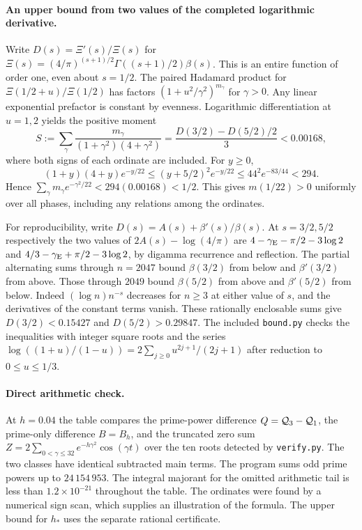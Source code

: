 \paragraph{An upper bound from two values of the completed logarithmic derivative.}
Write $D(s)=\Xi'(s)/\Xi(s)$ for
$\Xi(s)=(4/\pi)^{(s+1)/2}\Gamma((s+1)/2)\beta(s)$.
This is an entire function of order one, even about $s=1/2$.
The paired Hadamard product for
$\Xi(1/2+u)/\Xi(1/2)$ has factors
$(1+u^2/\gamma^2)^{m_\gamma}$ for $\gamma>0$.
Any linear exponential prefactor is constant by evenness.
Logarithmic differentiation at $u=1,2$ yields the positive moment
\[
 S:=\sum_{\gamma}\frac{m_\gamma}{(1+\gamma^2)(4+\gamma^2)}
       =\frac{D(3/2)-D(5/2)/2}{3}<0.00168 ,
\]
where both signs of each ordinate are included. For $y\ge0$,
\[
 (1+y)(4+y)e^{-y/22}\le(y+5/2)^2 e^{-y/22}
 \le44^2 e^{-83/44}<294 .
\]
Hence $\sum_\gamma m_\gamma e^{-\gamma^2/22}<294(0.00168)<1/2$.
This gives $m(1/22)>0$ uniformly over all phases, including any
relations among the ordinates.

For reproducibility, write $D(s)=A(s)+\beta'(s)/\beta(s)$. At
$s=3/2,5/2$ respectively the two values of $2A(s)-\log(4/\pi)$
are $4-\gamma_{\rm E}-\pi/2-3\log2$ and
$4/3-\gamma_{\rm E}+\pi/2-3\log2$, by digamma recurrence and reflection.
The partial alternating sums through $n=2047$ bound $\beta(3/2)$
from below and $\beta'(3/2)$ from above. Those through $2049$ bound
$\beta(5/2)$ from above and $\beta'(5/2)$ from below. Indeed
$(\log n)n^{-s}$ decreases for $n\ge3$ at either value of $s$,
and the derivatives of the constant terms vanish.
These rationally enclosable sums give $D(3/2)<0.15427$ and
$D(5/2)>0.29847$. The included \texttt{bound.py} checks the
inequalities with integer square roots and the series
$\log((1+u)/(1-u))=2\sum_{j\ge0}u^{2j+1}/(2j+1)$ after reduction
to $0\le u\le1/3$.

\paragraph{Direct arithmetic check.}
At $h=0.04$ the table compares the prime-power difference
$Q=\mathcal Q_3-\mathcal Q_1$, the prime-only difference $B=B_h$, and
the truncated zero sum $Z=2\sum_{0<\gamma\le32}
e^{-h\gamma^2}\cos(\gamma t)$ over the ten roots detected by
\texttt{verify.py}. The two classes have identical subtracted
main terms. The program sums odd prime powers up to $24\,154\,953$.
The integral majorant for the omitted arithmetic tail is less than
$1.2\times10^{-21}$ throughout the table. The ordinates were found
by a numerical sign scan, which supplies an illustration of the
formula. The upper bound for $h_*$ uses the separate rational certificate.

